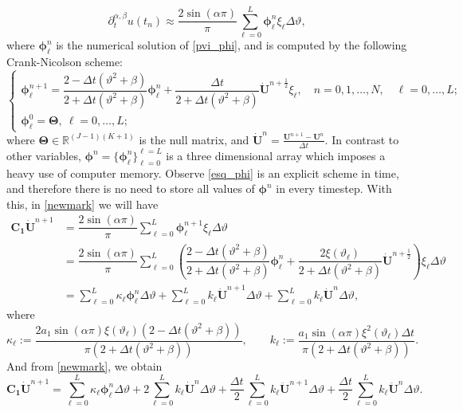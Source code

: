 \documentclass[12pt]{article}
\numberwithin{equation}{section}
\begin{document}
\begin{equation}\label{der_frac_disc}
\partial_t^{\alpha,\beta}u(t_n) \approx \dfrac{2\sin(\alpha \pi)}{\pi}\sum\limits_{\ell = 0}^{L} \boldsymbol{\phi}_\ell^n \xi_\ell \Delta \vartheta,
\end{equation}
where $\boldsymbol{\phi}_\ell^n$ is the numerical solution of \eqref{pvi_phi}, and is computed by the following Crank-Nicolson scheme:
\begin{equation}\label{esq_phi}
\begin{cases}
\boldsymbol{\phi}_\ell^{n+1} = \dfrac{2-\Delta t(\vartheta^2+\beta)}{2+\Delta t(\vartheta^2+\beta)}\boldsymbol{\phi}_\ell^n + \dfrac{\Delta t}{2+\Delta t(\vartheta^2 + \beta)}\boldsymbol{\dot{U}}^{n+\frac12}\xi_\ell,\quad n=0,1,\dots,N,\quad \ell = 0,\dots,L; \\
\boldsymbol{\phi}_\ell^{0} = \boldsymbol{\Theta},\: \ell = 0,\dots,L;
\end{cases}
\end{equation}
where $\boldsymbol{\Theta} \in \mathbb{R}^{(J-1)(K+1)}$ is the null matrix, and $\boldsymbol{\dot{U}}^n = \frac{\boldsymbol{U}^{n+1} - \boldsymbol{U}^n}{\Delta t}$. In contrast to other variables, $\boldsymbol{\phi}^n = \{ \boldsymbol{\phi}_\ell^n\}_{\ell=0}^{\ell = L}$ is a three dimensional array which imposes a heavy use of computer memory. Observe \eqref{esq_phi} is an explicit scheme in time, and therefore there is no need to store all values of $\boldsymbol{\phi}^n$ in every timestep. With this, in \eqref{newmark} we will have
\begin{align}
\boldsymbol{C_1}\boldsymbol{\dot{U}}^{n+1} &= \dfrac{2\sin(\alpha \pi)}{\pi}\sum\limits_{\ell = 0}^{L} \boldsymbol{\phi}_\ell^{n+1} \xi_\ell \Delta \vartheta \nonumber \\
&= \dfrac{2\sin(\alpha \pi)}{\pi}\sum\limits_{\ell = 0}^{L} \left(\dfrac{2-\Delta t (\vartheta^2+\beta)}{2+\Delta t (\vartheta^2+\beta)}\boldsymbol{\phi}_\ell^n + \dfrac{2\xi(\vartheta_\ell)}{2+\Delta t (\vartheta^2+\beta)}\boldsymbol{\dot{U}}^{n+\frac12}\right) \xi_\ell \Delta \vartheta \nonumber \\
&= \sum\limits_{\ell=0}^L\kappa_\ell \boldsymbol{\phi}_\ell^n \Delta \vartheta + \sum\limits_{\ell=0}^L k_\ell \boldsymbol{\dot{U}}^{n+1} \Delta \vartheta + \sum\limits_{\ell=0}^L k_\ell \boldsymbol{\dot{U}}^{n} \Delta \vartheta, \nonumber
\end{align}
where
\[ \kappa_\ell := \dfrac{2a_1\sin(\alpha \pi)\xi(\vartheta_\ell) (2-\Delta t (\vartheta^2+\beta))}{\pi(2+\Delta t (\vartheta^2+\beta))},\qquad k_\ell := \dfrac{a_1\sin(\alpha\pi)\xi^2(\vartheta_\ell) \Delta t}{\pi (2+\Delta t(\vartheta^2+\beta))}. \]
And from \eqref{newmark}, we obtain
\begin{equation}\label{C1}
\boldsymbol{C_1}\boldsymbol{\dot{U}}^{n+1} = \sum\limits_{\ell=0}^L\kappa_\ell \boldsymbol{\phi}_\ell^n \Delta \vartheta + 2\sum\limits_{\ell=0}^L k_\ell \boldsymbol{\dot{U}}^{n} \Delta \vartheta + \dfrac{\Delta t}{2} \sum\limits_{\ell=0}^L k_\ell \boldsymbol{\ddot{U}}^{n+1} \Delta \vartheta + \dfrac{\Delta t }{2} \sum\limits_{\ell=0}^L k_\ell \boldsymbol{\ddot{U}}^{n} \Delta \vartheta.
\end{equation}
\end{document}
